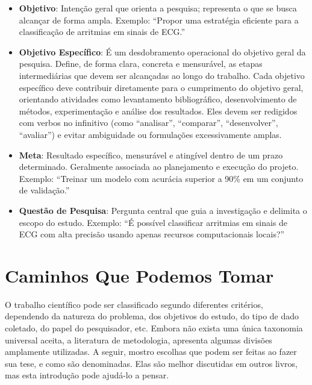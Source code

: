 \begin{itemize}
  \item \textbf{Objetivo}: Intenção geral que orienta a pesquisa; representa o que se busca alcançar de forma ampla. Exemplo: ``Propor uma estratégia eficiente para a classificação de arritmias em sinais de ECG.''

  \item \textbf{Objetivo Específico}: É um desdobramento operacional do objetivo geral da pesquisa. Define, de forma clara, concreta e mensurável, as etapas intermediárias que devem ser alcançadas ao longo do trabalho. Cada objetivo específico deve contribuir diretamente para o cumprimento do objetivo geral, orientando atividades como levantamento bibliográfico, desenvolvimento de métodos, experimentação e análise dos resultados. Eles devem ser redigidos com verbos no infinitivo (como ``analisar'', ``comparar'', ``desenvolver'', ``avaliar'') e evitar ambiguidade ou formulações excessivamente amplas.

  \item \textbf{Meta}: Resultado específico, mensurável e atingível dentro de um prazo determinado. Geralmente associada ao planejamento e execução do projeto. Exemplo: ``Treinar um modelo com acurácia superior a 90\% em um conjunto de validação.''

  \item \textbf{Questão de Pesquisa}: Pergunta central que guia a investigação e delimita o escopo do estudo. Exemplo: ``É possível classificar arritmias em sinais de ECG com alta precisão usando apenas recursos computacionais locais?''
\end{itemize}


\section{Caminhos Que Podemos Tomar}




O trabalho científico pode ser classificado segundo diferentes critérios, dependendo da natureza do problema, dos objetivos do estudo, do tipo de dado coletado, do papel do pesquisador, etc. 
Embora não exista uma única taxonomia universal aceita, a literatura de metodologia, apresenta algumas divisões amplamente utilizadas. 
A seguir, mostro escolhas que podem ser feitas ao fazer sua tese, e como são denominadas. 
Elas são melhor discutidas em outros livros, mas esta introdução pode ajudá-lo a pensar.

